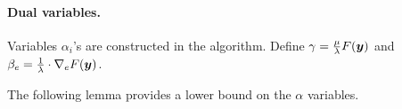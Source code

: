 \paragraph{Dual variables.} 
Variables $\alpha_{i}$'s  are constructed in the algorithm. 
Define $\gamma = \frac{\mu}{\lambda} F(\bm{y})$ and 
$\beta_{e} = \frac{1}{\lambda} \cdot \nabla_{e} F(\bm{y})$.


The following lemma provides a lower bound on the $\alpha$ variables.


